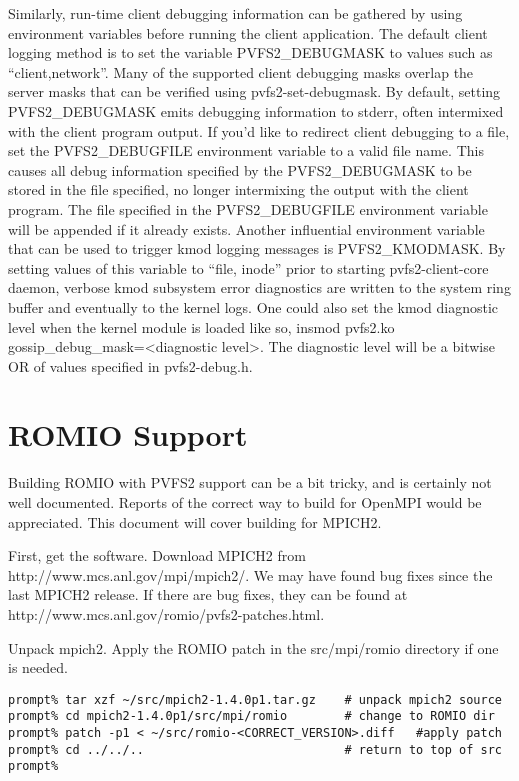 \documentclass[11pt, letterpaper]{article}
\begin{document}
Similarly, run-time client debugging information can be gathered by
using environment variables before running the client application.
The default client logging method is to set the variable
PVFS2\_DEBUGMASK to values such as ``client,network''.  Many of the
supported client debugging masks overlap the server masks that can be
verified using pvfs2-set-debugmask.  By default, setting
PVFS2\_DEBUGMASK emits debugging information to stderr, often
intermixed with the client program output.  If you'd like to redirect
client debugging to a file, set the PVFS2\_DEBUGFILE environment
variable to a valid file name.  This causes all debug information
specified by the PVFS2\_DEBUGMASK to be stored in the file specified,
no longer intermixing the output with the client program.  The file
specified in the PVFS2\_DEBUGFILE environment variable will be
appended if it already exists. 
Another influential environment variable that can be used to trigger
kmod logging messages is PVFS2\_KMODMASK. By setting values of this variable
to ``file, inode'' prior to starting pvfs2-client-core daemon,
verbose kmod subsystem error diagnostics are written to the system ring buffer
and eventually to the kernel logs.
One could also set the kmod diagnostic level when the kernel module is loaded
like so, insmod pvfs2.ko gossip\_debug\_mask=<diagnostic level>.
The diagnostic level will be a bitwise OR of values specified in pvfs2-debug.h.

\section{ROMIO Support}
\label{sec:romio}

Building ROMIO with PVFS2 support can be a bit tricky, and is certainly not
well documented.  Reports of the correct way to build for OpenMPI would be
appreciated.  This document will cover building for MPICH2. 

First, get the software.  Download MPICH2 from
http://www.mcs.anl.gov/mpi/mpich2/.  We may have found bug fixes since the last MPICH2 release.  If there are bug fixes, they can be found at
http://www.mcs.anl.gov/romio/pvfs2-patches.html. 

Unpack mpich2. Apply the ROMIO patch in the src/mpi/romio directory if one is
needed. 

\begin{verbatim}
prompt% tar xzf ~/src/mpich2-1.4.0p1.tar.gz    # unpack mpich2 source
prompt% cd mpich2-1.4.0p1/src/mpi/romio        # change to ROMIO dir
prompt% patch -p1 < ~/src/romio-<CORRECT_VERSION>.diff   #apply patch
prompt% cd ../../..                            # return to top of src
prompt% 
\end{verbatim}
\end{document}
